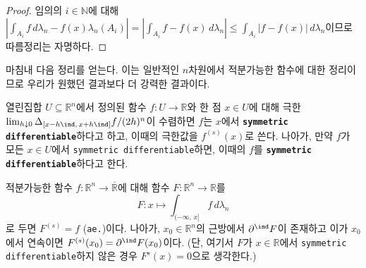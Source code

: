 \begin{proof}
    임의의 $i\in\mathbb{N}$에 대해 $|\int_{A_i}f\,d\lambda_n-f(x)\lambda_n(A_i)|=|\int_{A_i}f-f(x)\,d\lambda_n|\leq\int_{A_i}|f-f(x)|\,d\lambda_n$이므로 따름정리는 자명하다.
\end{proof}

마침내 다음 정리를 얻는다. 이는 일반적인 $n$차원에서 적분가능한 함수에 대한 정리이므로 우리가 원했던 결과보다 더 강력한 결과이다.

\begin{definition}
    열린집합 $U\subseteq\mathbb{R}^n$에서 정의된 함수 $f:U\to\mathbb{R}$와 한 점 $x\in U$에 대해 극한 $\lim_{h\downarrow0}\Delta_{[x-h\ind,\,x+h\ind]}f/(2h)^n$이 수렴하면 $f$는 $x$에서 \textbf{\texttt{symmetric differentiable}}하다고 하고, 이때의 극한값을 $f^{(s)}(x)$로 쓴다. 나아가, 만약 $f$가 모든 $x\in U$에서 \texttt{symmetric differentiable}하면, 이때의 $f$를 \textbf{\texttt{symmetric differentiable}}하다고 한다.
\end{definition}

\begin{corollary}\label{cor:FTC1}
    적분가능한 함수 $f:\mathbb{R}^n\to\overline{\mathbb{R}}$에 대해 함수 $F:\mathbb{R}^n\to\mathbb{R}$를
    \begin{equation*}
        F:x\mapsto\int_{(-\infty,\,x]}f\,d\lambda_n
    \end{equation*}
    로 두면 $F^{(s)}=f$ (\texttt{ae.})이다. 나아가, $x_0\in\mathbb{R}^n$의 근방에서 $\partial^\ind F$이 존재하고 이가 $x_0$에서 연속이면 $F^{(s)}(x_0)=\partial^\ind F(x_0)$이다. (단, 여기서 $F$가 $x\in\mathbb{R}$에서 \texttt{symmetric differentiable}하지 않은 경우 $F^{{s}}(x)=0$으로 생각한다.)
\end{corollary}

